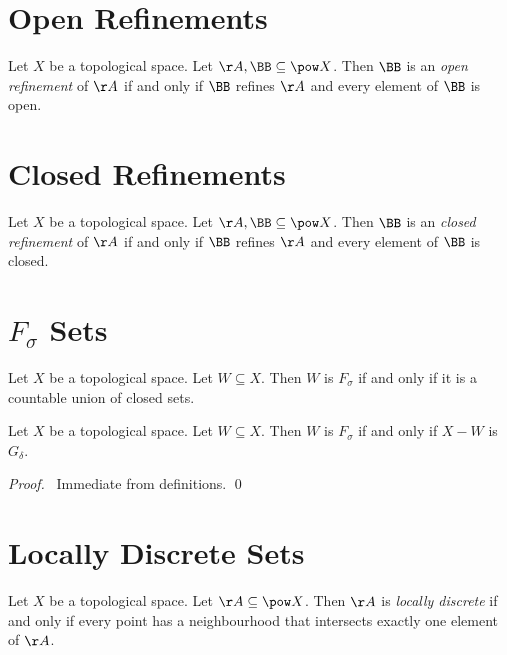 \section{Open Refinements}

\begin{definition}
    Let $X$ be a topological space. Let $\AA, \BB \subseteq \pow X$. Then $\BB$ is an \emph{open refinement} of
    $\AA$ if and only if $\BB$ refines $\AA$ and every element of $\BB$ is open.
\end{definition}

\section{Closed Refinements}

\begin{definition}
    Let $X$ be a topological space. Let $\AA, \BB \subseteq \pow X$. Then $\BB$ is an \emph{closed refinement} of
    $\AA$ if and only if $\BB$ refines $\AA$ and every element of $\BB$ is closed.
\end{definition}

\section{$F_\sigma$ Sets}

\begin{definition}
    Let $X$ be a topological space. Let $W \subseteq X$. Then $W$ is \emph{$F_\sigma$} if and only if
    it is a countable union of closed sets.
\end{definition}

\begin{proposition}
    Let $X$ be a topological space. Let $W \subseteq X$. Then $W$ is $F_\sigma$ if and only if $X - W$
    is $G_\delta$.
\end{proposition}

\begin{proof}
    \pf\ Immediate from definitions. \qed
\end{proof}

\section{Locally Discrete Sets}

\begin{definition}
    Let $X$ be a topological space. Let $\AA \subseteq \pow X$. Then $\AA$ is \emph{locally discrete}
    if and only if every point has a neighbourhood that intersects exactly one element of $\AA$.
\end{definition}

